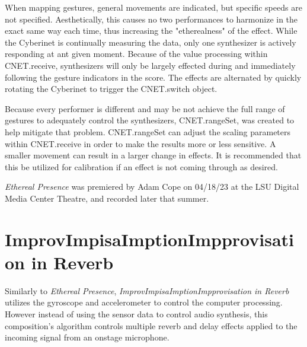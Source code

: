 When mapping gestures, general movements are indicated, but specific speeds are not specified. Aesthetically, this causes no two performances to harmonize in the exact same way each time, thus increasing the "etherealness" of the effect. While the Cyberinet is continually measuring the data, only one synthesizer is actively responding at ant given moment. Because of the value processing within CNET.receive, synthesizers will only be largely effected during and immediately following the gesture indicators in the score. The effects are alternated by quickly rotating the Cyberinet to trigger the CNET.switch object.

Because every performer is different and may be not achieve the full range of gestures to adequately control the synthesizers, CNET.rangeSet, was created to help mitigate that problem. CNET.rangeSet can adjust the scaling parameters within CNET.receive in order to make the results more or less sensitive. A smaller movement can result in a larger change in effects. It is recommended that this be utilized for calibration if an effect is not coming through as desired.

\textit{Ethereal Presence} was premiered by Adam Cope on 04/18/23 at the LSU Digital Media Center Theatre, and recorded later that summer.


\section{ImprovImpisaImptionImpprovisation in Reverb}
Similarly to \textit{Ethereal Presence}, \textit{ImprovImpisaImptionImpprovisation in Reverb} utilizes the gyroscope and accelerometer to control the computer processing. However instead of using the sensor data to control audio synthesis, this composition's algorithm controls multiple reverb and delay effects applied to the incoming signal from an onstage microphone.

